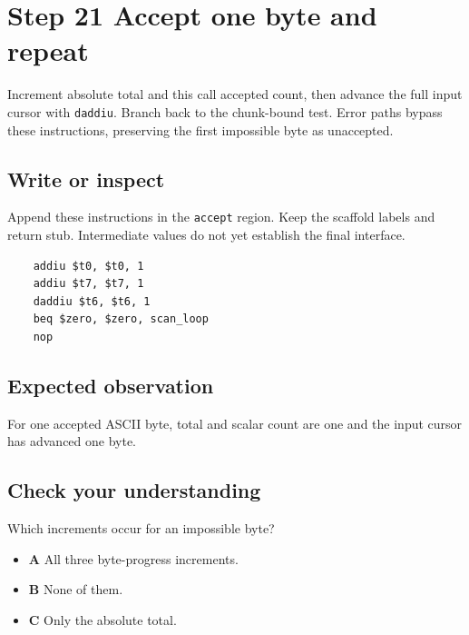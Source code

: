 \section{Step 21 Accept one byte and repeat}\label{utf8-s21}

Increment absolute total and this call accepted count, then advance the full input cursor with \texttt{daddiu}. Branch back to the chunk-bound test. Error paths bypass these instructions, preserving the first impossible byte as unaccepted.

\subsection{Write or inspect}
Append these instructions in the \texttt{accept} region. Keep the scaffold labels and return stub. Intermediate values do not yet establish the final interface.

\begin{verbatim}
    addiu $t0, $t0, 1
    addiu $t7, $t7, 1
    daddiu $t6, $t6, 1
    beq $zero, $zero, scan_loop
    nop
\end{verbatim}

\subsection{Expected observation}
For one accepted ASCII byte, total and scalar count are one and the input cursor has advanced one byte.

\subsection{Check your understanding}
Which increments occur for an impossible byte?

\begin{itemize}
  \item \textbf{A} All three byte-progress increments.
  \item \textbf{B} None of them.
  \item \textbf{C} Only the absolute total.
\end{itemize}
